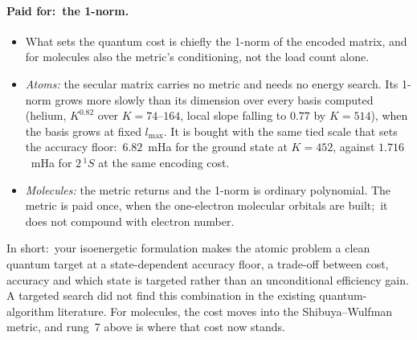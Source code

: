 \documentclass[11pt]{article}
\begin{document}
\paragraph{Paid for:\ the 1-norm.}
\begin{itemize}
\item What sets the quantum cost is chiefly the 1-norm of the encoded
matrix, and for molecules also the metric's conditioning, not the load count
alone.
\item \emph{Atoms:} the secular matrix carries no metric and needs no energy
search. Its 1-norm grows more slowly than its dimension over every basis
computed (helium, $K^{0.82}$ over $K=74$--$164$, local slope falling to
$0.77$ by $K=514$), when the basis grows at fixed $l_{\max}$. It is bought
with the same tied scale that sets the accuracy floor:\ $6.82$~mHa for the
ground state at $K=452$, against $1.716$~mHa for $2\,^1S$ at the same
encoding cost.
\item \emph{Molecules:} the metric returns and the 1-norm is ordinary
polynomial. The metric is paid once, when the one-electron molecular
orbitals are built;\ it does not compound with electron number.
\end{itemize}

\noindent In short:\ your isoenergetic formulation makes the atomic problem
a clean quantum target at a state-dependent accuracy floor, a trade-off
between cost, accuracy and which state is targeted rather than an
unconditional efficiency gain. A targeted search did not find this
combination in the existing quantum-algorithm literature. For molecules, the
cost moves into the Shibuya--Wulfman metric, and rung~7 above is where that
cost now stands.

\end{document}
